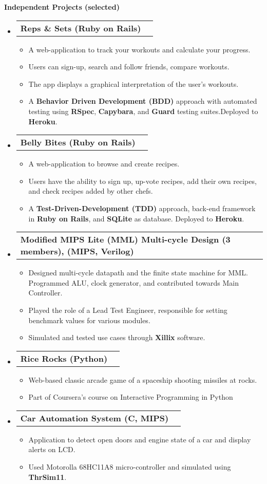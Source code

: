 \documentclass[letterpaper,10pt]{article}
\makeatletter
\newcommand{\resitem}[1]{\item #1 \vspace{-2pt}}
\newcommand{\resheading}[1]{{\large \colorbox{mygrey}{\begin{minipage}{\textwidth}{\textbf{#1 \vphantom{p\^{E}}}}\end{minipage}}}}
\newcommand{\ressubheading}[4]{
\begin{tabular*}{7.0in}{l@{\extracolsep{\fill}}r}
		\textbf{#1} & \textit{#4} \\
\end{tabular*}\vspace{-6pt}}
\makeatother
\begin{document}
\resheading{Independent Projects (selected)}
\begin{itemize}
\item
	\ressubheading{Reps \& Sets (Ruby on Rails)}{}{}{}
	\begin{itemize}
		\resitem{A web-application to track your workouts and calculate your progress.}
        \resitem{Users can sign-up, search and follow friends, compare workouts.} 
        \resitem{The app displays a graphical interpretation of the user's workouts.} 
        \resitem{A \textbf{Behavior Driven Development (BDD)} approach with automated testing using \textbf{RSpec}, \textbf{Capybara}, and \textbf{Guard} testing suites.Deployed to \textbf{Heroku}.}
	\end{itemize}
    
    \item
	\ressubheading{Belly Bites (Ruby on Rails)}{}{}{}
	\begin{itemize}
		\resitem{A web-application to browse and create recipes.}
        \resitem{Users have the ability to sign up, up-vote recipes, add their own recipes, and check recipes added by other chefs.} 
        \resitem{A \textbf{Test-Driven-Development (TDD)} approach, back-end framework in \textbf{Ruby on Rails}, and \textbf{SQLite} as database. Deployed to \textbf{Heroku}.}
        
	\end{itemize}
    
        \item
	\ressubheading{Modified MIPS Lite (MML) Multi-cycle Design (3 members), (MIPS, Verilog)}{}{}{}
	\begin{itemize}
		\resitem{Designed multi-cycle datapath and the finite state machine for MML. Programmed ALU, clock generator, and contributed towards Main Controller.}
        \resitem{Played the role of a Lead Test Engineer, responsible for setting benchmark values for various modules.}
        \resitem{Simulated and tested use cases through \textbf{Xillix} software.}        
	\end{itemize}
    
     \item
	\ressubheading{Rice Rocks (Python)}{}{}{}
	\begin{itemize}
		\resitem{Web-based classic arcade game of a spaceship shooting missiles at rocks.}
        \resitem{Part of Coursera's course on Interactive Programming in Python}
	\end{itemize}
 
	\item
	\ressubheading{Car Automation System (C, MIPS)}{}{}{}
	\begin{itemize}
		\resitem{Application to detect open doors and engine state of a car and display alerts on LCD.}
        \resitem{Used Motorolla 68HC11A8 micro-controller and simulated using \textbf{ThrSim11}.}         
	\end{itemize}
 

\end{itemize}
\end{document}
